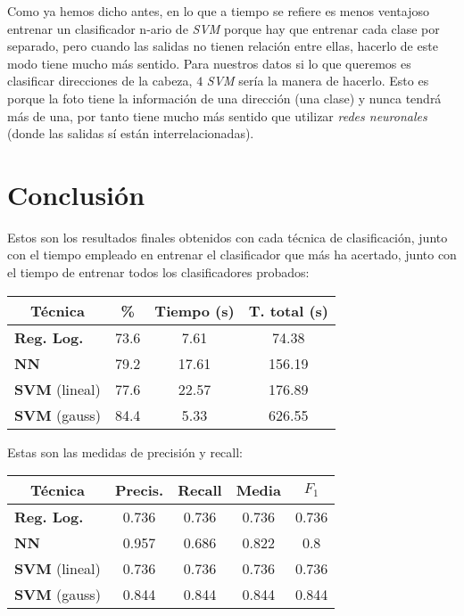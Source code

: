 \documentclass[titlepage]{article}
\begin{document}
\begin{multicols*}{2}
Como ya hemos dicho antes, en lo que a tiempo se refiere es menos ventajoso entrenar un clasificador n-ario de \textit{SVM} porque hay que entrenar cada clase por separado, pero cuando las salidas no tienen relación entre ellas, hacerlo de este modo tiene mucho más sentido.
Para nuestros datos si lo que queremos es clasificar direcciones de la cabeza, $4$ \textit{SVM} sería la manera de hacerlo. Esto es porque la foto tiene la información de una dirección (una clase) y nunca tendrá más de una, por tanto tiene mucho más sentido que utilizar \textit{redes neuronales} (donde las salidas sí están interrelacionadas).

\section{Conclusión}
Estos son los resultados finales obtenidos con cada técnica de clasificación, junto con el tiempo empleado en entrenar el clasificador que más ha acertado, junto con el tiempo de entrenar todos los clasificadores probados:

\begin{center}
\begin{tabular}{ |l|c|c|c| }
 \hline
 \multicolumn{1}{|c|}{\textbf{Técnica}} & \textbf{\%} & \textbf{Tiempo} (s) & \textbf{T. total} (s) \\
 \hline
 \textbf{Reg. Log.} & 73.6 & 7.61 & 74.38 \\
 \textbf{NN} & 79.2 & 17.61 & 156.19 \\
 \textbf{SVM} (lineal) & 77.6 & 22.57 & 176.89 \\
 \textbf{SVM} (gauss) & 84.4 & 5.33 & 626.55 \\
 \hline
\end{tabular}
\end{center}

Estas son las medidas de precisión y recall:

\begin{center}
\begin{tabular}{ |l|c|c||c|c| }
 \hline
 \multicolumn{1}{|c|}{\textbf{Técnica}} & \textbf{Precis.} & \textbf{Recall} & \textbf{Media} & \textbf{$F_1$} \\
 \hline
 \textbf{Reg. Log.} & 0.736 & 0.736 & 0.736 & 0.736 \\
 \textbf{NN} & 0.957 & 0.686 & 0.822 & 0.8 \\
 \textbf{SVM} (lineal) & 0.736 & 0.736 & 0.736 & 0.736 \\
 \textbf{SVM} (gauss) & 0.844 & 0.844 & 0.844 & 0.844 \\
 \hline
\end{tabular}
\end{center}


\end{multicols*}
\end{document}
